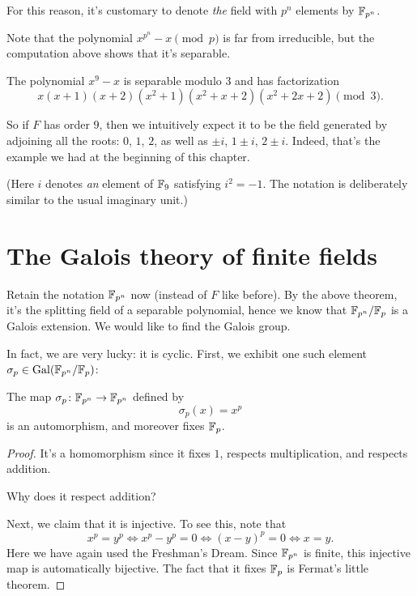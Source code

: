 \begin{definition}
	For this reason, it's customary to denote \emph{the}
	field with $p^n$ elements by $\mathbb F_{p^n}$.
\end{definition}

Note that the polynomial $x^{p^n}-x \pmod p$ is far from irreducible, but
the computation above shows that it's separable.
\begin{example}
	The polynomial $x^9-x$ is separable modulo $3$ and has factorization
	\[ x(x+1)(x+2)(x^2+1)(x^2+x+2)(x^2+2x+2) \pmod 3. \]

	So if $F$ has order $9$, then we intuitively expect it to be the field
	generated by adjoining all the roots: $0$, $1$, $2$, as well as
	$\pm i$, $1 \pm i$, $2 \pm i$.
	Indeed, that's the example we had at the beginning of this chapter.

	(Here $i$ denotes \emph{an} element of $\mathbb F_9$ satisfying $i^2=-1$.
	The notation is deliberately similar to the usual imaginary unit.)
\end{example}

\section{The Galois theory of finite fields}
Retain the notation $\mathbb F_{p^n}$ now (instead of $F$ like before).
By the above theorem, it's the splitting field of a separable polynomial,
hence we know that $\mathbb F_{p^n} /\mathbb F_p$ is a Galois extension.
We would like to find the Galois group.

In fact, we are very lucky: it is cyclic.
First, we exhibit one such element $\sigma_p \in \operatorname{Gal}(\mathbb F_{p^n} /\mathbb F_p)$:

\begin{theorem}
	The map $\sigma_p \colon \mathbb F_{p^n} \to \mathbb F_{p^n}$ defined by
	\[ \sigma_p(x) = x^p \]
	is an automorphism, and moreover fixes $\mathbb F_p$.
\end{theorem}
\begin{proof}
	It's a homomorphism since it fixes $1$,
	respects multiplication,
	and respects addition.
	\begin{ques}
		Why does it respect addition?
	\end{ques}
	Next, we claim that it is injective. To see this, note that
	\[ x^p = y^p
		\iff x^p - y^p = 0
		\iff (x-y)^p = 0
		\iff x=y.
	\]
	Here we have again used the Freshman's Dream.
	Since $\mathbb F_{p^n}$ is finite, this injective map is automatically bijective.
	The fact that it fixes $\mathbb F_p$ is Fermat's little theorem.
\end{proof}

